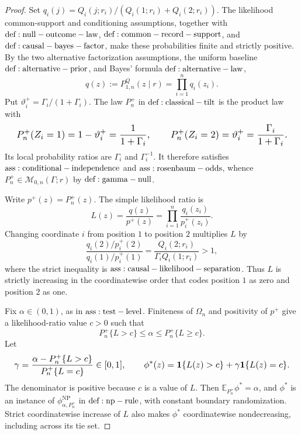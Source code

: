 \documentclass{article}
\begin{document}
\begin{proof}
Set \(q_i(j)=Q_i(j;r_i)/(Q_i(1;r_i)+Q_i(2;r_i))\). The likelihood common-support and conditioning assumptions, together with \({\rm def:null-outcome-law}\), \({\rm def:common-record-support}\), and \({\rm def:causal-bayes-factor}\), make these probabilities finite and strictly positive. By the two alternative factorization assumptions, the uniform baseline \({\rm def:alternative-prior}\), and Bayes' formula \({\rm def:alternative-law}\),
\[
 q(z):=P_{1,n}^{Q}(z\mid r)=\prod_{i=1}^nq_i(z_i).
\]
Put \(\vartheta_i^+=\Gamma_i/(1+\Gamma_i)\). The law \(P_n^+\) in \({\rm def:classical-tilt}\) is the product law with
\[
\makebox[\linewidth][c]{\resizebox{0.98\linewidth}{!}{\par\noindent \makebox[\linewidth][c]{\resizebox{0.98\linewidth}{!}{\(\displaystyle \displaystyle P_n^+(Z_i=1)=1-\vartheta_i^+=\frac1{1+\Gamma_i},\qquad P_n^+(Z_i=2)=\vartheta_i^+=\frac{\Gamma_i}{1+\Gamma_i}.\)}}\par\noindent}}
\]
Its local probability ratios are \(\Gamma_i\) and \(\Gamma_i^{-1}\). It therefore satisfies \({\rm ass:conditional-independence}\) and \({\rm ass:rosenbaum-odds}\), whence \(P_n^+\in\mathcal M_{0,n}(\Gamma;r)\) by \({\rm def:gamma-null}\).

Write \(p^+(z)=P_n^+(z)\). The simple likelihood ratio is
\[
 L(z)=\frac{q(z)}{p^+(z)}=\prod_{i=1}^n\frac{q_i(z_i)}{p_i^+(z_i)}.
\]
Changing coordinate \(i\) from position \(1\) to position \(2\) multiplies \(L\) by
\[
 \frac{q_i(2)/p_i^+(2)}{q_i(1)/p_i^+(1)}=\frac{Q_i(2;r_i)}{\Gamma_iQ_i(1;r_i)}>1,
\]
where the strict inequality is \({\rm ass:causal-likelihood-separation}\). Thus \(L\) is strictly increasing in the coordinatewise order that codes position \(1\) as zero and position \(2\) as one.

Fix \(\alpha\in(0,1)\), as in \({\rm ass:test-level}\). Finiteness of \(\Omega_n\) and positivity of \(p^+\) give a likelihood-ratio value \(c>0\) such that
\[
 P_n^+\{L>c\}\leq\alpha\leq P_n^+\{L\geq c\}.
\]
Let
\[
\makebox[\linewidth][c]{\resizebox{0.98\linewidth}{!}{\(\displaystyle \gamma=\frac{\alpha-P_n^+\{L>c\}}{P_n^+\{L=c\}}\in[0,1],\qquad
 \phi^*(z)=\mathbf1\{L(z)>c\}+\gamma\mathbf1\{L(z)=c\}.\)}}
\]
The denominator is positive because \(c\) is a value of \(L\). Then \(\mathbb E_{P_n^+}\phi^*=\alpha\), and \(\phi^*\) is an instance of \(\phi_{\alpha,P_n^+}^{\mathrm{NP}}\) in \({\rm def:np-rule}\), with constant boundary randomization. Strict coordinatewise increase of \(L\) also makes \(\phi^*\) coordinatewise nondecreasing, including across its tie set.


\end{proof}
\end{document}
